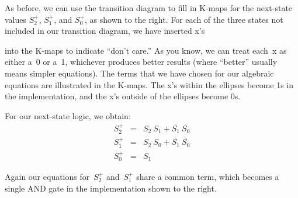 \begin{minipage}{2.6in}
As before, we can use the transition diagram to fill in K-maps for the 
next-state values $S_2^+$, $S_1^+$, and $S_0^+$, as shown to the right.
For each of the three states not included in our transition diagram,
we have inserted x's\linebreak
\end{minipage}\hspace{.3in}%
\begin{minipage}{1.00in}
\vspace{8pt}
\end{minipage}\hspace{.25in}\begin{minipage}{1.00in}
\vspace{8pt}
\end{minipage}\hspace{.25in}\begin{minipage}{1.00in}
\vspace{8pt}
\end{minipage}\mpdone

into the K-maps to indicate ``don't care.'' 
As you know, we can treat each~x as either a~0 or a~1, whichever
produces better results (where ``better'' usually means simpler 
equations).  The terms that we have chosen for our algebraic 
equations are illustrated in the K-maps.  The x's within the ellipses
become 1s in the implementation, and the x's outside of the ellipses
become 0s.

\begin{minipage}{3.25in}
For our next-state logic, we obtain:
\begin{eqnarray*}
S_2^+ &=& S_2~S_1 + \overline{\mbox{$S_1$}}~\overline{\mbox{$S_0$}} \\
S_1^+ &=& S_2~S_0 + \overline{\mbox{$S_1$}}~\overline{\mbox{$S_0$}} \\
S_0^+ &=& S_1
\end{eqnarray*}

Again our equations for~$S_2^+$ and~$S_1^+$ share a common term,
which becomes a single AND gate in the implementation shown to the
right.\vspace{100pt}
\end{minipage}\hspace{.25in}%
\begin{minipage}{3in}
\end{minipage}


